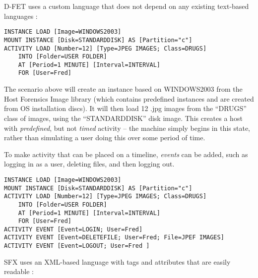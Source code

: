 \documentclass[letterpaper,12pt]{report}
\begin{document}
D-FET uses a custom language that does not depend on any existing
text-based languages \cite{williamCloudbasedDigitalForensics2011}:

\begin{lstlisting}
INSTANCE LOAD [Image=WINDOWS2003] 
MOUNT INSTANCE [Disk=STANDARDDISK] AS [Partition="c"] 
ACTIVITY LOAD [Number=12] [Type=JPEG IMAGES; Class=DRUGS] 
    INTO [Folder=USER FOLDER] 
    AT [Period=1 MINUTE] [Interval=INTERVAL] 
    FOR [User=Fred]
\end{lstlisting}

The scenario above will create an instance based on WINDOWS2003 from the
Host Forensics Image library (which contains predefined instances and
are created from OS installation discs). It will then load 12 .jpg
images from the ``DRUGS'' class of images, using the ``STANDARDDISK''
disk image. This creates a host with \emph{predefined}, but not
\emph{timed} activity -- the machine simply begins in this state, rather
than simulating a user doing this over some period of time.

To make activity that can be placed on a timeline, \emph{events} can be
added, such as logging in as a user, deleting files, and then logging
out.

\begin{lstlisting}
INSTANCE LOAD [Image=WINDOWS2003] 
MOUNT INSTANCE [Disk=STANDARDDISK] AS [Partition="c"] 
ACTIVITY LOAD [Number=12] [Type=JPEG IMAGES; Class=DRUGS] 
    INTO [Folder=USER FOLDER] 
    AT [Period=1 MINUTE] [Interval=INTERVAL] 
    FOR [User=Fred]
ACTIVITY EVENT [Event=LOGIN; User=Fred] 
ACTIVITY EVENT [Event=DELETEFILE; User=Fred; File=JPEF IMAGES] 
ACTIVITY EVENT [Event=LOGOUT; User=Fred ]
\end{lstlisting}

SFX uses an XML-based language with tags and attributes that are easily
readable \cite{russellForensicImageDescription2012}:
\end{document}
